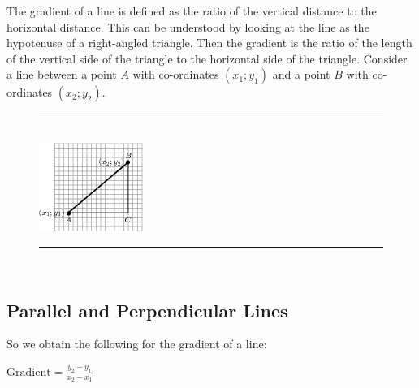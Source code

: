         \label{m39108*id68057}The gradient of a line is defined as the ratio of the vertical distance to the horizontal distance. This can be understood by looking at the line as the hypotenuse of a right-angled triangle. Then the gradient is the ratio of the length of the vertical side of the triangle to the horizontal side of the triangle. Consider a line between a point \begin{math}A\end{math} with co-ordinates \begin{math}\left({x}_{1};{y}_{1}\right)\end{math} and a point \begin{math}B\end{math} with co-ordinates \begin{math}\left({x}_{2};{y}_{2}\right)\end{math}.\par 
    \setcounter{subfigure}{0}
	\begin{figure}[H] %
    \begin{center}
    \rule[.1in]{\figurerulewidth}{.005in} \\
        \label{m39108*uid42!!!underscore!!!media}\label{m39108*uid42!!!underscore!!!printimage}\includegraphics{col11306.imgs/m39108_MG10C14_018.png} %
      \vspace{2pt}
    \vspace{.1in}
    \rule[.1in]{\figurerulewidth}{.005in} \\
    \end{center}
 \end{figure}   \subsection{Parallel and Perpendicular Lines}    
        \label{m39108*eip-127}So we obtain the following for the gradient of a line:\par \label{m39108*id68147}\begin{math}\mathrm{Gradient}=\frac{{y}_{2}-{y}_{1}}{{x}_{2}-{x}_{1}}\end{math}\par 
